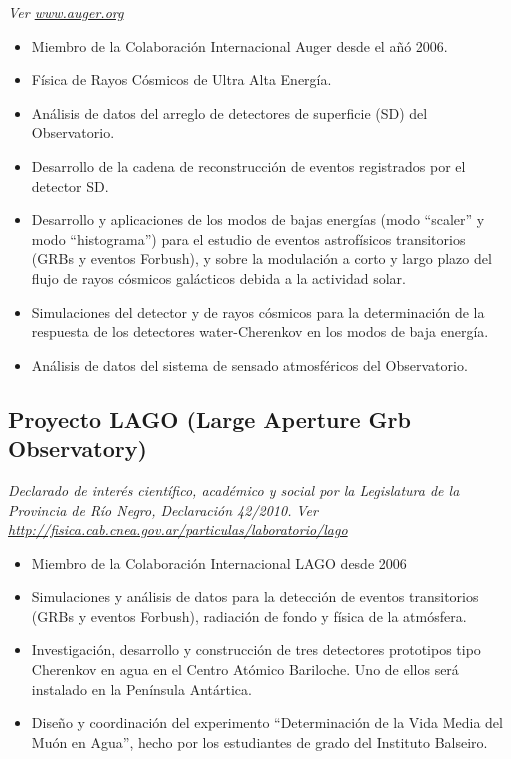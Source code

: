 {\small{\textit{Ver \href{http://www.auger.org/}{www.auger.org}}}}
\begin{itemize}
\item Miembro de la Colaboración Internacional Auger desde el añó 2006.
\item Física de Rayos Cósmicos de Ultra Alta Energía.
\item Análisis de datos del arreglo de detectores de superficie (SD) del Observatorio.
\item Desarrollo de la cadena de reconstrucción de eventos registrados por el detector SD.
\item Desarrollo y aplicaciones de los modos de bajas energías (modo ``scaler'' y modo ``histograma'') para el estudio de eventos astrofísicos transitorios (GRBs y eventos Forbush), y sobre la modulación a corto y largo plazo del flujo de rayos cósmicos galácticos debida a la actividad solar.
\item Simulaciones del detector y de rayos cósmicos para la determinación de la respuesta de los detectores water-Cherenkov en los modos de baja energía.
\item Análisis de datos del sistema de sensado atmosféricos del Observatorio.
\end{itemize}

\subsection*{Proyecto LAGO (Large Aperture Grb Observatory)}
{\emph{Declarado de interés científico, académico y social por la Legislatura de la
Provincia de Río Negro, Declaración 42/2010.}}
{\small{\textit{Ver \href{http://fisica.cab.cnea.gov.ar/particulas/laboratorio/lago}{http://fisica.cab.cnea.gov.ar/particulas/laboratorio/lago}}}}\\
\begin{itemize}
\item Miembro de la Colaboración Internacional LAGO desde 2006
\item Simulaciones y análisis de datos para la detección de eventos transitorios (GRBs y eventos Forbush), radiación de fondo y física de la atmósfera.
\item Investigación, desarrollo y construcción de tres detectores prototipos tipo Cherenkov en agua en el Centro Atómico Bariloche. Uno de ellos será instalado en la Península Antártica. 
\item Diseño y coordinación del experimento ``Determinación de la Vida Media del Muón en Agua'', hecho por los estudiantes de grado del Instituto Balseiro.
\end{itemize}

